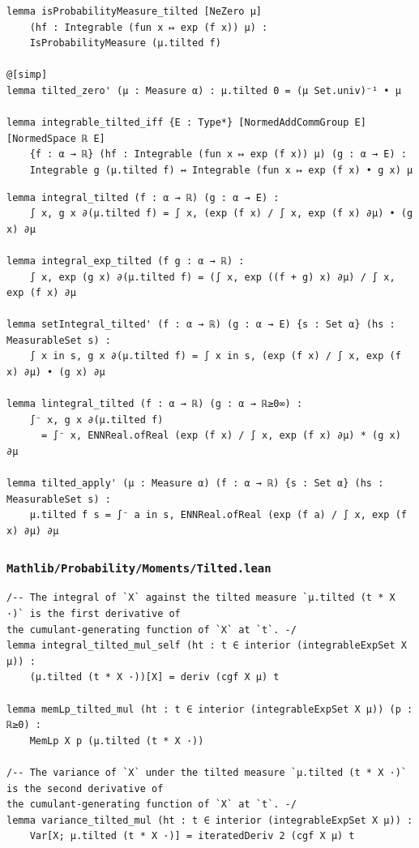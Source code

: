 \begin{lstlisting}[language=lean]
lemma isProbabilityMeasure_tilted [NeZero μ]
    (hf : Integrable (fun x ↦ exp (f x)) μ) :
    IsProbabilityMeasure (μ.tilted f)

@[simp]
lemma tilted_zero' (μ : Measure α) : μ.tilted 0 = (μ Set.univ)⁻¹ • μ

lemma integrable_tilted_iff {E : Type*} [NormedAddCommGroup E] [NormedSpace ℝ E]
    {f : α → ℝ} (hf : Integrable (fun x ↦ exp (f x)) μ) (g : α → E) :
    Integrable g (μ.tilted f) ↔ Integrable (fun x ↦ exp (f x) • g x) μ
\end{lstlisting}

\newpage
\begin{lstlisting}[language=lean]
lemma integral_tilted (f : α → ℝ) (g : α → E) :
    ∫ x, g x ∂(μ.tilted f) = ∫ x, (exp (f x) / ∫ x, exp (f x) ∂μ) • (g x) ∂μ

lemma integral_exp_tilted (f g : α → ℝ) :
    ∫ x, exp (g x) ∂(μ.tilted f) = (∫ x, exp ((f + g) x) ∂μ) / ∫ x, exp (f x) ∂μ

lemma setIntegral_tilted' (f : α → ℝ) (g : α → E) {s : Set α} (hs : MeasurableSet s) :
    ∫ x in s, g x ∂(μ.tilted f) = ∫ x in s, (exp (f x) / ∫ x, exp (f x) ∂μ) • (g x) ∂μ

lemma lintegral_tilted (f : α → ℝ) (g : α → ℝ≥0∞) :
    ∫⁻ x, g x ∂(μ.tilted f)
      = ∫⁻ x, ENNReal.ofReal (exp (f x) / ∫ x, exp (f x) ∂μ) * (g x) ∂μ

lemma tilted_apply' (μ : Measure α) (f : α → ℝ) {s : Set α} (hs : MeasurableSet s) :
    μ.tilted f s = ∫⁻ a in s, ENNReal.ofReal (exp (f a) / ∫ x, exp (f x) ∂μ) ∂μ
\end{lstlisting}

\subsubsection{\texttt{Mathlib/Probability/Moments/Tilted.lean}}
\begin{lstlisting}[language=lean]
/-- The integral of `X` against the tilted measure `μ.tilted (t * X ·)` is the first derivative of
the cumulant-generating function of `X` at `t`. -/
lemma integral_tilted_mul_self (ht : t ∈ interior (integrableExpSet X μ)) :
    (μ.tilted (t * X ·))[X] = deriv (cgf X μ) t

lemma memLp_tilted_mul (ht : t ∈ interior (integrableExpSet X μ)) (p : ℝ≥0) :
    MemLp X p (μ.tilted (t * X ·))

/-- The variance of `X` under the tilted measure `μ.tilted (t * X ·)` is the second derivative of
the cumulant-generating function of `X` at `t`. -/
lemma variance_tilted_mul (ht : t ∈ interior (integrableExpSet X μ)) :
    Var[X; μ.tilted (t * X ·)] = iteratedDeriv 2 (cgf X μ) t
\end{lstlisting}

